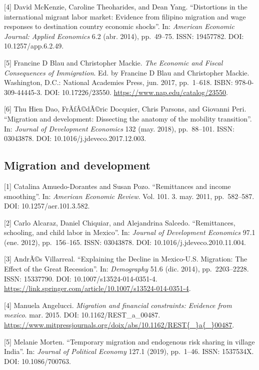 \documentclass[
  12pt,
]{article}
\begin{document}
{[}4{]} David McKenzie, Caroline Theoharides, and Dean Yang.
``Distortions in the international migrant labor market: Evidence from
filipino migration and wage responses to destination country economic
shocks''. In: \emph{American Economic Journal: Applied Economics} 6.2
(abr. 2014), pp.~49--75. ISSN: 19457782. DOI: 10.1257/app.6.2.49.

{[}5{]} Francine D Blau and Christopher Mackie.
\emph{The Economic and Fiscal Consequences of Immigration}. Ed. by
Francine D Blau and Christopher Mackie. Washington, D.C.: National
Academies Press, jun. 2017, pp.~1--618. ISBN: 978-0-309-44445-3. DOI:
10.17226/23550. \url{https://www.nap.edu/catalog/23550}.

{[}6{]} Thu Hien Dao, FrÃƒÂ©dÃ©ric Docquier, Chris Parsons, and Giovanni
Peri. ``Migration and development: Dissecting the anatomy of the
mobility transition''. In: \emph{Journal of Development Economics} 132
(may. 2018), pp.~88--101. ISSN: 03043878. DOI:
10.1016/j.jdeveco.2017.12.003.

\hypertarget{migration-and-development}{%
\subsection{Migration and development}\label{migration-and-development}}

{[}1{]} Catalina Amuedo-Dorantes and Susan Pozo. ``Remittances and
income smoothing''. In: \emph{American Economic Review}. Vol. 101. 3.
may. 2011, pp.~582--587. DOI: 10.1257/aer.101.3.582.

{[}2{]} Carlo Alcaraz, Daniel Chiquiar, and Alejandrina Salcedo.
``Remittances, schooling, and child labor in Mexico''. In:
\emph{Journal of Development Economics} 97.1 (ene. 2012), pp.~156--165.
ISSN: 03043878. DOI: 10.1016/j.jdeveco.2010.11.004.

{[}3{]} AndrÃ©s Villarreal. ``Explaining the Decline in Mexico-U.S.
Migration: The Effect of the Great Recession''. In: \emph{Demography}
51.6 (dic. 2014), pp.~2203--2228. ISSN: 15337790. DOI:
10.1007/s13524-014-0351-4.
\url{https://link.springer.com/article/10.1007/s13524-014-0351-4}.

{[}4{]} Manuela Angelucci.
\emph{Migration and financial constraints: Evidence from mexico}. mar.
2015. DOI: 10.1162/REST\_a\_00487.
\url{https://www.mitpressjournals.org/doix/abs/10.1162/REST{\_}a{\_}00487}.

{[}5{]} Melanie Morten. ``Temporary migration and endogenous risk
sharing in village India''. In: \emph{Journal of Political Economy}
127.1 (2019), pp.~1--46. ISSN: 1537534X. DOI: 10.1086/700763.
\end{document}
